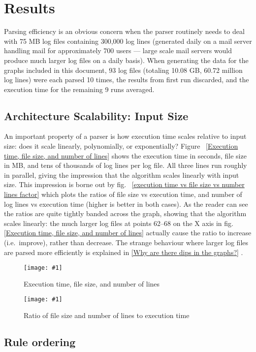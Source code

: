 \documentclass[draft]{svmult}
\newcommand{\showgraph}[3]{%
    \begin{figure}[hbt!]
        \caption{#2}\label{#3}
        \texttt{[image: \#1]}
    \end{figure}
}
\newcommand{\refwithpage}[1]{%
    \empty{}\vref{#1}%
}
\newcommand{\sectionref}[1]{%
    \textsection{}\vref*{#1}%
}
\newcommand{\numberOFlogFILES}[0]{%
    93%
}
\newcommand{\numberOFlogLINEShuman}[0]{%
    60.72 million%
}
\begin{document}
\section{Results}

Parsing efficiency is an obvious concern when the parser routinely needs to
deal with 75 MB log files containing 300,000 log lines (generated daily on
a mail server handling mail for approximately 700 users --- large scale
mail servers would produce much larger log files on a daily basis).  When
generating the data for the graphs included in this document,
\numberOFlogFILES{} log files (totaling 10.08 GB, \numberOFlogLINEShuman{}
log lines) were each parsed 10 times, the results from first run discarded,
and the execution time for the remaining 9 runs averaged.

\subsection{Architecture Scalability: Input Size}

An important property of a parser is how execution time scales relative to
input size: does it scale linearly, polynomially, or exponentially?
Figure~\refwithpage{Execution time, file size, and number of lines} shows
the execution time in seconds, file size in MB, and tens of thousands of
log lines per log file.  All three lines run roughly in parallel, giving
the impression that the algorithm scales linearly with input size.  This
impression is borne out by fig.~\refwithpage{execution time vs file size vs
number lines factor} which plots the ratios of file size vs execution time,
and number of log lines vs execution time (higher is better in both cases).
As the reader can see the ratios are quite tightly banded across the graph,
showing that the algorithm scales linearly: the much larger log files at
points 62--68 on the X axis in fig.~\refwithpage{Execution time, file size,
and number of lines} actually cause the ratio to increase (i.e.\ improve),
rather than decrease.  The strange behaviour where larger log files are
parsed more efficiently is explained in \sectionref{Why are there dips in
the graphs?}.  \showgraph{build/plot-normal-filesize-numlines}{Execution
time, file size, and number of lines}{Execution time, file size, and number
of lines} \showgraph{build/plot-normal-filesize-numlines-factor}{Ratio of
file size and number of lines to execution time}{execution time vs file
size vs number lines factor}

\subsection{Rule ordering}
\end{document}
